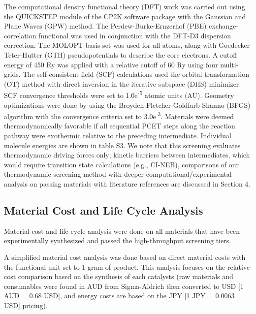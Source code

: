 \documentclass[twoside,twocolumn,9pt]{article}
\begin{document}
The computational density functional theory (DFT) work was carried out using the QUICKSTEP module\cite{vandevondele_quickstep_2005} of the CP2K software package\cite{kuhne_cp2k_2020} with the Gaussian and Plane Waves (GPW) method\cite{lippert_hybrid_1997}. The Perdew-Burke-Ernzerhof (PBE) exchange-correlation functional\cite{perdew_generalized_1996} was used in conjunction with the DFT-D3 dispersion correction\cite{grimme_dispersion-corrected_2016}. The MOLOPT basis set was used for all atoms\cite{vandevondele_gaussian_2007}, along with Goedecker-Teter-Hutter (GTH) pseudopotentials\cite{goedecker_separable_1996} to describe the core electrons. A cutoff energy of 450 Ry was applied with a relative cutoff of 60 Ry using four multi-grids. The self-consistent field (SCF) calculations\cite{kohn_self-consistent_1965} used the orbital transformation (OT) method\cite{vandevondele_efficient_2003} with direct inversion in the iterative subspace (DIIS) minimizer\cite{pulay_convergence_1980}. SCF convergence thresholds were set to 1.0e\textsuperscript{-5} atomic units (AU). Geometry optimizations were done by using the Broyden-Fletcher-Goldfarb-Shanno (BFGS) algorithm\cite{nocedal_numerical_2006} with the convergence criteria set to 3.0e\textsuperscript{-3}. Materials were deemed thermodynamically favorable if all sequential PCET steps along the reaction pathway were exothermic relative to the preceding intermediate. Individual molecule energies are shown in table S3. We note that this screening evaluates thermodynamic driving forces only; kinetic barriers between intermediates, which would require transition state calculations (e.g., CI-NEB), comparisons of our thermodynamic screening method with deeper computational/experimental analysis on passing materials with literature references are discussed in Section 4.



\subsection{Material Cost and Life Cycle Analysis}

Material cost and life cycle analysis were done on all materials that have been experimentally synthesized and passed the high-throughput screening tiers. 

A simplified material cost analysis was done based on direct material costs  with the functional unit set to 1 gram of product. This analysis focuses on the relative cost comparison based on the synthesis of each catalysts (raw materials and consumables were found in AUD from Sigma-Aldrich\cite{noauthor_sigma-aldrich_nodate} then converted to USD [1 AUD = 0.68 USD], and energy costs are based on the JPY [1 JPY = 0.0063 USD] pricing\cite{oneil_power_2024}). 
\end{document}
